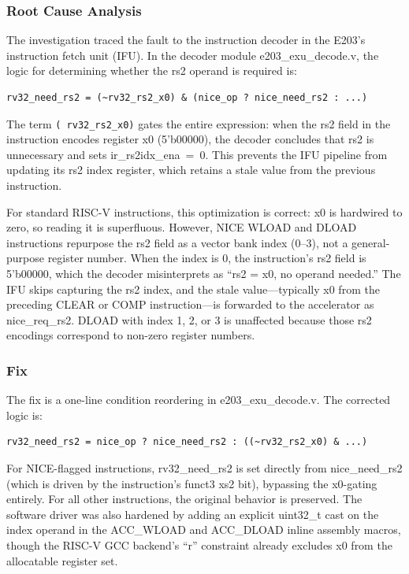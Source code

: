 \subsubsection{Root Cause Analysis}

The investigation traced the fault to the instruction decoder in the E203's instruction fetch unit (IFU). In the decoder module e203\_exu\_decode.v, the logic for determining whether the rs2 operand is required is:

\begin{verbatim}
rv32_need_rs2 = (~rv32_rs2_x0) & (nice_op ? nice_need_rs2 : ...)
\end{verbatim}

The term \texttt{(~rv32\_rs2\_x0)} gates the entire expression: when the rs2 field in the instruction encodes register x0 (5'b00000), the decoder concludes that rs2 is unnecessary and sets ir\_rs2idx\_ena~=~0. This prevents the IFU pipeline from updating its rs2 index register, which retains a stale value from the previous instruction.

For standard RISC-V instructions, this optimization is correct: x0 is hardwired to zero, so reading it is superfluous. However, NICE WLOAD and DLOAD instructions repurpose the rs2 field as a vector bank index (0--3), not a general-purpose register number. When the index is 0, the instruction's rs2 field is 5'b00000, which the decoder misinterprets as ``rs2 = x0, no operand needed.'' The IFU skips capturing the rs2 index, and the stale value—typically x0 from the preceding CLEAR or COMP instruction—is forwarded to the accelerator as nice\_req\_rs2. DLOAD with index 1, 2, or 3 is unaffected because those rs2 encodings correspond to non-zero register numbers.

\subsubsection{Fix}

The fix is a one-line condition reordering in e203\_exu\_decode.v. The corrected logic is:

\begin{verbatim}
rv32_need_rs2 = nice_op ? nice_need_rs2 : ((~rv32_rs2_x0) & ...)
\end{verbatim}

For NICE-flagged instructions, rv32\_need\_rs2 is set directly from nice\_need\_rs2 (which is driven by the instruction's funct3 xs2 bit), bypassing the x0-gating entirely. For all other instructions, the original behavior is preserved. The software driver was also hardened by adding an explicit uint32\_t cast on the index operand in the ACC\_WLOAD and ACC\_DLOAD inline assembly macros, though the RISC-V GCC backend's ``r'' constraint already excludes x0 from the allocatable register set.

